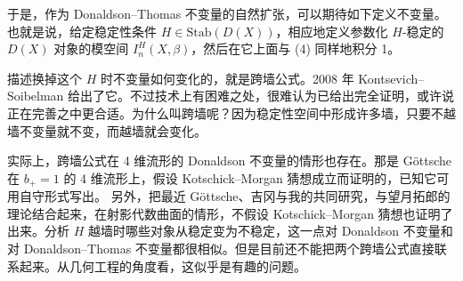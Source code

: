 于是，作为 Donaldson--Thomas 不变量的自然扩张，可以期待如下定义不变量。也就是说，给定稳定性条件 $H\in\mathrm{Stab}(D(X))$，相应地定义参数化 $H$-稳定的 $D(X)$ 对象的模空间 $I^H_n(X,\beta)$，然后在它上面与 (4) 同样地积分 1。

描述换掉这个 $H$ 时不变量如何变化的，就是跨墙公式。2008 年 Kontsevich--Soibelman 给出了它。不过技术上有困难之处，很难认为已给出完全证明，或许说正在完善之中更合适。为什么叫跨墙呢？因为稳定性空间中形成许多墙，只要不越墙不变量就不变，而越墙就会变化。

实际上，跨墙公式在 4 维流形的 Donaldson 不变量的情形也存在。那是 Göttsche 在 $b_+=1$ 的 4 维流形上，假设 Kotschick--Morgan 猜想成立而证明的，已知它可用自守形式写出。
另外，把最近 Göttsche、吉冈与我的共同研究，与望月拓郎的理论结合起来，在射影代数曲面的情形，不假设 Kotschick--Morgan 猜想也证明了出来。分析 $H$ 越墙时哪些对象从稳定变为不稳定，这一点对 Donaldson 不变量和对 Donaldson--Thomas 不变量都很相似。但是目前还不能把两个跨墙公式直接联系起来。从几何工程的角度看，这似乎是有趣的问题。

\renewcommand{\thesection}{\Roman{section}}


